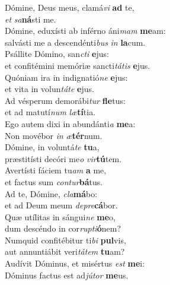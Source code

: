 \evenverse Dómine, Deus meus, clamá\textit{vi} \textbf{ad} te,~\*\\
\evenverse \textit{et} \textit{sa}\textbf{ná}sti me.\\
\oddverse Dómine, eduxísti ab inférno áni\textit{mam} \textbf{me}am:~\*\\
\oddverse salvásti me a descendénti\textit{bus} \textit{in} \textbf{la}cum.\\
\evenverse Psállite Dómino, san\textit{cti} \textbf{e}jus:~\*\\
\evenverse et confitémini memóriæ sancti\textit{tá}\textit{tis} \textbf{e}jus.\\
\oddverse Quóniam ira in indignatió\textit{ne} \textbf{e}jus:~\*\\
\oddverse et vita in volun\textit{tá}\textit{te} \textbf{e}jus.\\
\evenverse Ad vésperum demorábi\textit{tur} \textbf{fle}tus:~\*\\
\evenverse et ad matutí\textit{num} \textit{læ}\textbf{tí}tia.\\
\oddverse Ego autem dixi in abundánti\textit{a} \textbf{me}a:~\*\\
\oddverse Non movébor \textit{in} \textit{æ}\textbf{tér}num.\\
\evenverse Dómine, in voluntá\textit{te} \textbf{tu}a,~\*\\
\evenverse præstitísti decóri me\textit{o} \textit{vir}\textbf{tú}tem.\\
\oddverse Avertísti fáciem tu\textit{am} \textbf{a} me,~\*\\
\oddverse et factus sum \textit{con}\textit{tur}\textbf{bá}tus.\\
\evenverse Ad te, Dómine, \textit{cla}\textbf{má}bo:~\*\\
\evenverse et ad Deum meum \textit{de}\textit{pre}\textbf{cá}bor.\\
\oddverse Quæ utílitas in sángui\textit{ne} \textbf{me}o,~\*\\
\oddverse dum descéndo in cor\textit{rup}\textit{ti}\textbf{ó}nem?\\
\evenverse Numquid confitébitur ti\textit{bi} \textbf{pul}vis,~\*\\
\evenverse aut annuntiábit veri\textit{tá}\textit{tem} \textbf{tu}am?\\
\oddverse Audívit Dóminus, et misértus \textit{est} \textbf{me}i:~\*\\
\oddverse Dóminus factus est ad\textit{jú}\textit{tor} \textbf{me}us.\\
